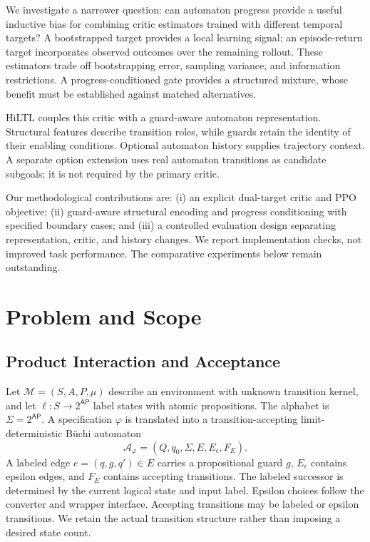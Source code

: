 \documentclass[conference]{IEEEtran}
\begin{document}
We investigate a narrower question: can automaton progress provide a useful inductive bias for combining critic estimators trained with different temporal targets? A bootstrapped target provides a local learning signal; an episode-return target incorporates observed outcomes over the remaining rollout. These estimators trade off bootstrapping error, sampling variance, and information restrictions. A progress-conditioned gate provides a structured mixture, whose benefit must be established against matched alternatives.

HiLTL couples this critic with a guard-aware automaton representation. Structural features describe transition roles, while guards retain the identity of their enabling conditions. Optional automaton history supplies trajectory context. A separate option extension uses real automaton transitions as candidate subgoals; it is not required by the primary critic.

Our methodological contributions are: (i) an explicit dual-target critic and PPO objective; (ii) guard-aware structural encoding and progress conditioning with specified boundary cases; and (iii) a controlled evaluation design separating representation, critic, and history changes. We report implementation checks, not improved task performance. The comparative experiments below remain outstanding.

\section{Problem and Scope}
\label{sec:problem}
\subsection{Product Interaction and Acceptance}
Let $\mathcal M=(S,A,P,\mu)$ describe an environment with unknown transition kernel, and let $\ell:S\rightarrow2^{\mathsf{AP}}$ label states with atomic propositions. The alphabet is $\Sigma=2^{\mathsf{AP}}$. A specification $\varphi$ is translated into a transition-accepting limit-deterministic B\"uchi automaton
\[
\mathcal A_\varphi=(Q,q_0,\Sigma,E,E_\epsilon,F_E).
\]
A labeled edge $e=(q,g,q')\in E$ carries a propositional guard $g$, $E_\epsilon$ contains epsilon edges, and $F_E$ contains accepting transitions. The labeled successor is determined by the current logical state and input label. Epsilon choices follow the converter and wrapper interface. Accepting transitions may be labeled or epsilon transitions. We retain the actual transition structure rather than imposing a desired state count.
\end{document}
